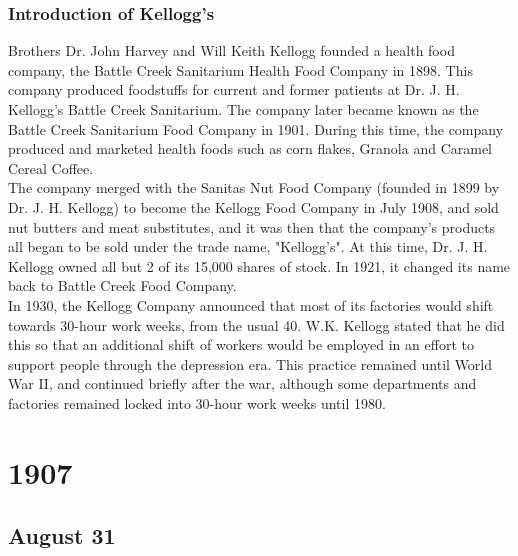 \documentclass[11pt]{report}
\begin{document}
\subsection{Introduction of Kellogg's}
Brothers Dr. John Harvey and Will Keith Kellogg founded a health food company, the Battle Creek Sanitarium Health Food Company in 1898. This company produced foodstuffs for current and former patients at Dr. J. H. Kellogg's Battle Creek Sanitarium. The company later became known as the Battle Creek Sanitarium Food Company in 1901. During this time, the company produced and marketed health foods such as corn flakes, Granola and Caramel Cereal Coffee.\\ \indent The company merged with the Sanitas Nut Food Company (founded in 1899 by Dr. J. H. Kellogg) to become the Kellogg Food Company in July 1908, and sold nut butters and meat substitutes, and it was then that the company's products all began to be sold under the trade name, "Kellogg's". At this time, Dr. J. H. Kellogg owned all but 2 of its 15,000 shares of stock. In 1921, it changed its name back to Battle Creek Food Company.\\
\indent In 1930, the Kellogg Company announced that most of its factories would shift towards 30-hour work weeks, from the usual 40. W.K. Kellogg stated that he did this so that an additional shift of workers would be employed in an effort to support people through the depression era. This practice remained until World War II, and continued briefly after the war, although some departments and factories remained locked into 30-hour work weeks until 1980.

\chapter{1907}
\section{August 31}
\end{document}
